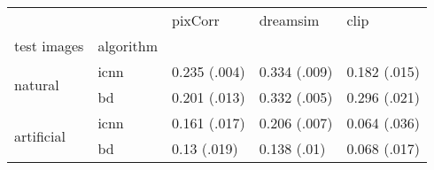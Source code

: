 \begin{tabular}{lllll}
\toprule
 &   & pixCorr & dreamsim & clip \\
test images & algorithm &  &  &  \\
\midrule
\multirow[t]{2}{*}{natural} & icnn & 0.235 (.004) & 0.334 (.009) & 0.182 (.015) \\
 & bd & 0.201 (.013) & 0.332 (.005) & 0.296 (.021) \\
\cline{1-5}
\multirow[t]{2}{*}{artificial} & icnn & 0.161 (.017) & 0.206 (.007) & 0.064 (.036) \\
 & bd & 0.13 (.019) & 0.138 (.01) & 0.068 (.017) \\
\cline{1-5}
\bottomrule
\end{tabular}
